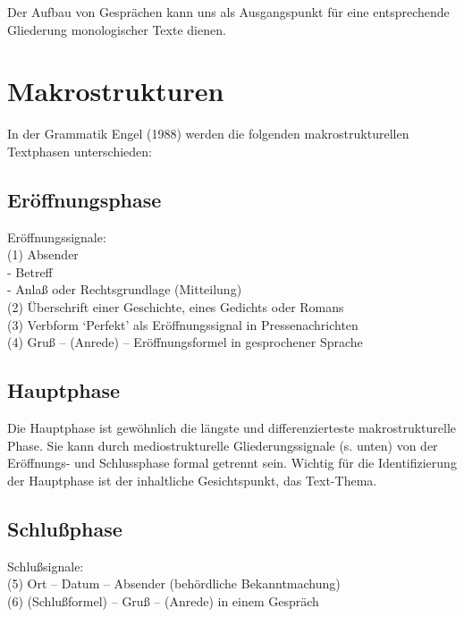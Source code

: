 \documentclass[
  letterpaper,
]{scrbook}
\begin{document}
Der Aufbau von Gesprächen kann uns als Ausgangspunkt für eine
entsprechende Gliederung monologischer Texte dienen.

\hypertarget{makrostrukturen}{%
\section{Makrostrukturen}\label{makrostrukturen}}

In der Grammatik Engel (1988) werden die folgenden makrostrukturellen
Textphasen unterschieden:\\

\hypertarget{eruxf6ffnungsphase}{%
\subsection{Eröffnungsphase}\label{eruxf6ffnungsphase}}

Eröffnungssignale:\\
(1) Absender\\
- Betreff\\
- Anlaß oder Rechtsgrundlage (Mitteilung)\\
(2) Überschrift einer Geschichte, eines Gedichts oder Romans\\
(3) Verbform `Perfekt' als Eröffnungssignal in Pressenachrichten\\
(4) Gruß -- (Anrede) -- Eröffnungsformel in gesprochener Sprache\\

\hypertarget{hauptphase}{%
\subsection{Hauptphase}\label{hauptphase}}

Die Hauptphase ist gewöhnlich die längste und differenzierteste
makrostrukturelle Phase. Sie kann durch mediostrukturelle
Gliederungssignale (s. unten) von der Eröffnungs- und Schlussphase
formal getrennt sein. Wichtig für die Identifizierung der Hauptphase ist
der inhaltliche Gesichtspunkt, das Text-Thema.

\hypertarget{schluuxdfphase}{%
\subsection{Schlußphase}\label{schluuxdfphase}}

Schlußsignale:\\
(5) Ort -- Datum -- Absender (behördliche Bekanntmachung)\\
(6) (Schlußformel) -- Gruß -- (Anrede) in einem Gespräch\\
\end{document}
